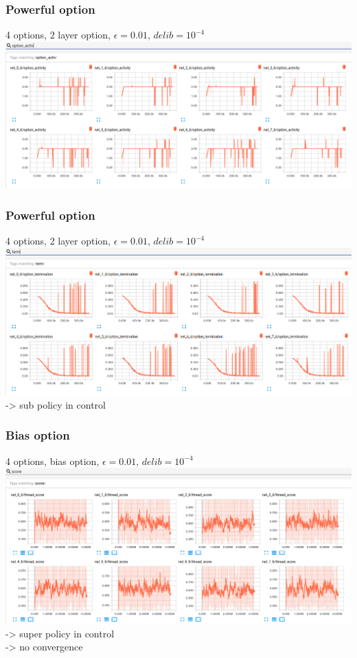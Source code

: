 \documentclass{beamer}
\begin{document}
\begin{frame}
\frametitle{Powerful option}
4 options, 2 layer option, $\epsilon = 0.01$, $delib = 10^{-4}$
\includegraphics[scale=0.2]{./strong/activity.png}
\end{frame}

\begin{frame}
\frametitle{Powerful option}
4 options, 2 layer option, $\epsilon = 0.01$, $delib = 10^{-4}$
\includegraphics[scale=0.2]{./strong/termination.png}
-> sub policy in control
\end{frame}


\begin{frame}
\frametitle{Bias option}
4 options, bias option, $\epsilon = 0.01$, $delib = 10^{-4}$
\includegraphics[scale=0.2]{./bias/score_non.png}\\
-> super policy in control\\
-> no convergence
\end{frame}
\end{document}
